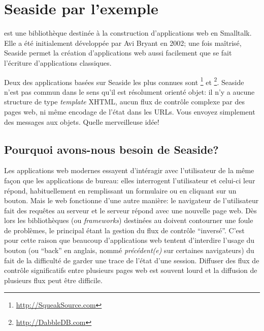 \documentclass[a4paper,10pt,twoside]{book}
\begin{document}
	\sloppy
\fi
\chapter{Seaside par l'exemple}


 est une bibliothèque destinée à la construction
d'applications web en Smalltalk. 
Elle a été initialement développée par Avi Bryant  
en 2002; 
une fois maîtrisé, Seaside permet la création d'applications
web aussi facilement que se fait l'écriture d'applications classiques.

Deux des applications basées sur Seaside les plus connues sont 
 \footnote{\url{http://SqueakSource.com}} et \footnote{\url{http://DabbleDB.com}}.
Seaside n'est pas commun dans le sens qu'il est résolument orienté
objet: il n'y a aucune structure de type \emph{template} XHTML, aucun
flux de contrôle complexe par des pages web, ni même encodage de
l'état dans les URLs. Vous envoyez simplement des messages aux
objets. Quelle merveilleuse idée!

\section{Pourquoi avons-nous besoin de Seaside?}

Les applications web modernes essayent d'intéragir avec l'utilisateur
de la même façon que les applications de bureau: elles interrogent
l'utilisateur et celui-ci leur répond, habituellement en remplissant
un formulaire ou en cliquant sur un bouton.
Mais le web fonctionne d'une autre manière: le navigateur de
l'utilisateur fait des requêtes au serveur et le serveur répond avec
une nouvelle page web.
Dès lors les bibliothèques (ou \emph{frameworks}) destinées au
 doivent contourner une foule de
problèmes, le principal étant la gestion du flux de contrôle ``inversé''.
C'est pour cette raison que beaucoup d'applications web tentent
d'interdire l'usage du bouton \backbtn (ou ``back'' en anglais, nommé
\emph{précédent(e)} sur certaines navigateurs) du fait de la
difficulté de garder une trace de l'état d'une session.
Diffuser des flux de contrôle significatifs entre plusieurs pages web 
est souvent lourd et la diffusion de plusieurs flux peut être difficile.
\end{document}
